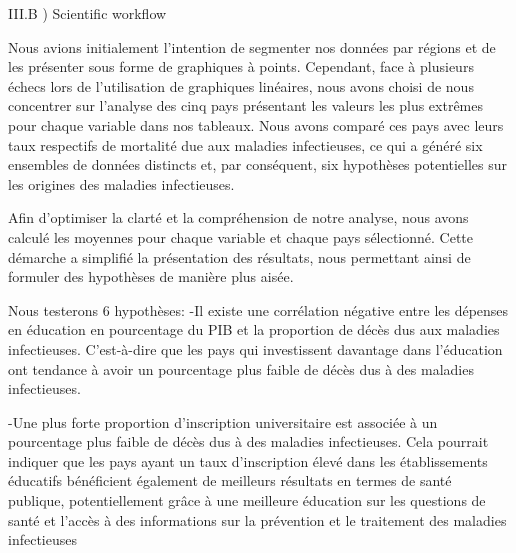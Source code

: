 \documentclass[
]{article}
\newenvironment{Shaded}{\begin{snugshade}}{\end{snugshade}}
\newcommand{\AttributeTok}[1]{\textcolor[rgb]{0.13,0.29,0.53}{#1}}
\newcommand{\DecValTok}[1]{\textcolor[rgb]{0.00,0.00,0.81}{#1}}
\newcommand{\FunctionTok}[1]{\textcolor[rgb]{0.13,0.29,0.53}{\textbf{#1}}}
\newcommand{\NormalTok}[1]{#1}
\newcommand{\OtherTok}[1]{\textcolor[rgb]{0.56,0.35,0.01}{#1}}
\newcommand{\SpecialCharTok}[1]{\textcolor[rgb]{0.81,0.36,0.00}{\textbf{#1}}}
\newcommand{\StringTok}[1]{\textcolor[rgb]{0.31,0.60,0.02}{#1}}
\begin{document}
\begin{Shaded}
\end{Shaded}

III.B ) Scientific workflow

Nous avions initialement l'intention de segmenter nos données par
régions et de les présenter sous forme de graphiques à points.
Cependant, face à plusieurs échecs lors de l'utilisation de graphiques
linéaires, nous avons choisi de nous concentrer sur l'analyse des cinq
pays présentant les valeurs les plus extrêmes pour chaque variable dans
nos tableaux. Nous avons comparé ces pays avec leurs taux respectifs de
mortalité due aux maladies infectieuses, ce qui a généré six ensembles
de données distincts et, par conséquent, six hypothèses potentielles sur
les origines des maladies infectieuses.

Afin d'optimiser la clarté et la compréhension de notre analyse, nous
avons calculé les moyennes pour chaque variable et chaque pays
sélectionné. Cette démarche a simplifié la présentation des résultats,
nous permettant ainsi de formuler des hypothèses de manière plus aisée.

Nous testerons 6 hypothèses: -Il existe une corrélation négative entre
les dépenses en éducation en pourcentage du PIB et la proportion de
décès dus aux maladies infectieuses. C'est-à-dire que les pays qui
investissent davantage dans l'éducation ont tendance à avoir un
pourcentage plus faible de décès dus à des maladies infectieuses.

-Une plus forte proportion d'inscription universitaire est associée à un
pourcentage plus faible de décès dus à des maladies infectieuses. Cela
pourrait indiquer que les pays ayant un taux d'inscription élevé dans
les établissements éducatifs bénéficient également de meilleurs
résultats en termes de santé publique, potentiellement grâce à une
meilleure éducation sur les questions de santé et l'accès à des
informations sur la prévention et le traitement des maladies
infectieuses
\end{document}
